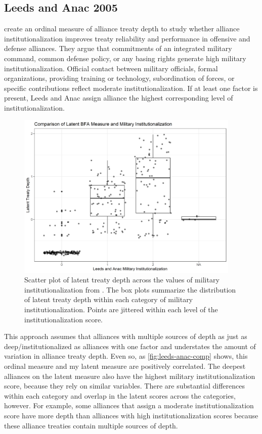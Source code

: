\documentclass[12pt]{article}
\begin{document}
\subsection{Leeds and Anac 2005}


\citet{LeedsAnac2005} create an ordinal measure of alliance treaty depth to study whether alliance institutionalization improves treaty reliability and performance in offensive and defense alliances. 
They argue that commitments of an integrated military command, common defense policy, or any basing rights generate high military institutionalization. 
Official contact between military officials, formal organizations, providing training or technology, subordination of forces, or specific contributions reflect moderate institutionalization. 
If at least one factor is present, Leeds and Anac assign alliance the highest corresponding level of institutionalization. 


\begin{figure}[htbp]
	\centering
		\includegraphics[width=0.95\textwidth]{leeds-anac-comp.png}
	\caption{Scatter plot of latent treaty depth across the values of military institutionalization from \citet{LeedsAnac2005}. The box plots summarize the distribution of latent treaty depth within each category of military institutionalization. Points are jittered within each level of the institutionalization score.}
	\label{fig:leeds-anac-comp}
\end{figure}

This approach assumes that alliances with multiple sources of depth as just as deep/institutionalized as alliances with one factor and understates the amount of variation in alliance treaty depth. 
Even so, as \autoref{fig:leeds-anac-comp} shows, this ordinal measure and my latent measure are positively correlated. 
The deepest alliances on the latent measure also have the highest military institutionalization score, because they rely on similar variables. 
There are substantial differences within each category and overlap in the latent scores across the categories, however. 
For example, some alliances that \citet{LeedsAnac2005} assign a moderate institutionalization score have more depth than alliances with high institutionalization scores because these alliance treaties contain multiple sources of depth. 
\end{document}
